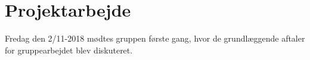 \section{Projektarbejde}\label{projektarbejde}

Fredag den 2/11-2018 mødtes gruppen første gang, hvor de grundlæggende aftaler for gruppearbejdet blev diskuteret. 